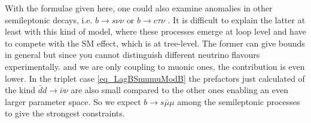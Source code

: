 With the formulae given here, one could also examine anomalies in other semileptonic decays, i.e. $b \rightarrow s\nu\nu$ \cite{1409.4557} or $b \rightarrow c\tau\nu$ \cite{1507.03233}. 
It is difficult to explain the latter at least with this kind of model, where these processes emerge at loop level and have to compete with the 
SM effect, which is at tree-level. The former can give bounds in general but since you cannot distinguish different neutrino flavours experimentally.
and we are only coupling to muonic ones, the contribution is even lower. In the triplet case \eqref{eq_LagBSmumuModB} the prefactors just calculated 
of the kind $\bar dd\rightarrow \bar\nu\nu$
are also small compared to the other ones enabling an even larger parameter space. So we expect $b\rightarrow s\bar \mu \mu$ among the semileptonic
processes to give the strongest constraints.
 


%  
